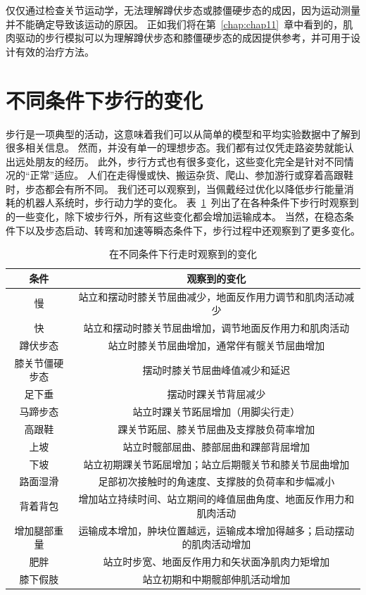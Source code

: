 仅仅通过检查关节运动学，无法理解蹲伏步态或膝僵硬步态的成因，因为运动测量并不能确定导致该运动的原因。
正如我们将在第~\ref{chap:chap11}~章中看到的，肌肉驱动的步行模拟可以为理解蹲伏步态和膝僵硬步态的成因提供参考，并可用于设计有效的治疗方法。


\section{不同条件下步行的变化}

步行是一项典型的活动，这意味着我们可以从简单的模型和平均实验数据中了解到很多相关信息。
然而，并没有单一的理想步态。我们都有过仅凭走路姿势就能认出远处朋友的经历。
此外，步行方式也有很多变化，这些变化完全是针对不同情况的“正常”适应。
人们在走得慢或快、搬运杂货、爬山、参加游行或穿着高跟鞋时，步态都会有所不同。
我们还可以观察到，当佩戴经过优化以降低步行能量消耗的机器人系统时，步行动力学的变化。
表~\ref{tab:2_1}~列出了在各种条件下步行时观察到的一些变化，除下坡步行外，所有这些变化都会增加运输成本。
当然，在稳态条件下以及步态启动、转弯和加速等瞬态条件下，步行过程中还观察到了更多变化。


\begin{table}[htbp]
	\caption{在不同条件下行走时观察到的变化} \label{tab:2_1} \centering
	\begin{tabular}{cc} %
		\toprule
		条件 & 观察到的变化  \\
		\midrule
		慢 & 站立和摆动时膝关节屈曲减少，地面反作用力调节和肌肉活动减少  \\
		\midrule
		快 & 站立和摆动时膝关节屈曲增加，调节地面反作用力和肌肉活动  \\
		\midrule
		蹲伏步态 & 站立时膝关节屈曲增加，通常伴有髋关节屈曲增加  \\
		\midrule
		膝关节僵硬步态 & 摆动时膝关节屈曲峰值减少和延迟  \\
		\midrule
		足下垂 & 摆动时踝关节背屈减少  \\
		\midrule
		马蹄步态 & 站立时踝关节跖屈增加（用脚尖行走）  \\
		\midrule
		高跟鞋 & 踝关节跖屈、膝关节屈曲及支撑肢负荷率增加  \\
		\midrule
		上坡 & 站立时髋部屈曲、膝部屈曲和踝部背屈增加  \\
		\midrule
		下坡 & 站立初期踝关节跖屈增加；站立后期髋关节和膝关节屈曲增加  \\
		\midrule
		路面湿滑 & 足部初次接触时的角速度、支撑肢的负荷率和步幅减小  \\
		\midrule
		背着背包 & 增加站立持续时间、站立期间的峰值屈曲角度、地面反作用力和肌肉活动  \\
		\midrule
		增加腿部重量 & 运输成本增加，肿块位置越远，运输成本增加得越多；启动摆动的肌肉活动增加  \\
		\midrule
		肥胖 & 站立时步宽、地面反作用力和矢状面净肌肉力矩增加  \\
		\midrule
		膝下假肢 & 站立初期和中期髋部伸肌活动增加  \\
		\bottomrule
	\end{tabular}
\end{table}


